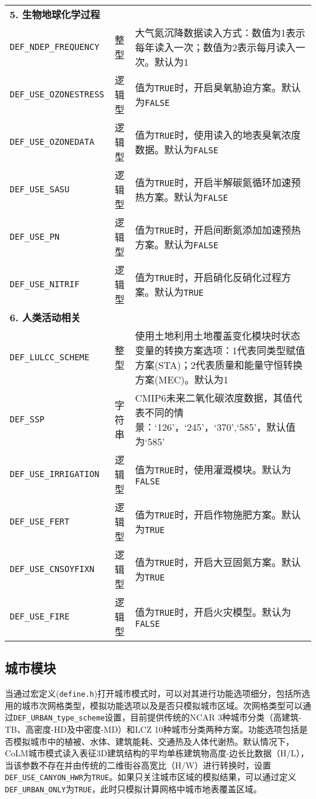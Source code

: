 {\begin{longtable}[!htbp]{lcp{}}
\textbf{5. 生物地球化学过程} && \\
\texttt{DEF\_NDEP\_FREQUENCY} & 整型 & 大气氮沉降数据读入方式：数值为1表示每年读入一次；数值为2表示每月读入一次。默认为1 \\
\texttt{DEF\_USE\_OZONESTRESS} & 逻辑型 & 值为\texttt{TRUE}时，开启臭氧胁迫方案。默认为\texttt{FALSE} \\
\texttt{DEF\_USE\_OZONEDATA} & 逻辑型 & 值为\texttt{TRUE}时，使用读入的地表臭氧浓度数据。默认为\texttt{FALSE} \\
\texttt{DEF\_USE\_SASU} & 逻辑型 & 值为\texttt{TRUE}时，开启半解碳氮循环加速预热方案。默认为\texttt{FALSE}\\
\texttt{DEF\_USE\_PN} & 逻辑型 & 值为\texttt{TRUE}时，开启间断氮添加加速预热方案。默认为\texttt{FALSE}\\
\texttt{DEF\_USE\_NITRIF} & 逻辑型 & 值为\texttt{TRUE}时，开启硝化反硝化过程方案。默认为\texttt{TRUE} \\
\midrule

\textbf{6. 人类活动相关} && \\

\texttt{DEF\_LULCC\_SCHEME} & 整型 & 使用土地利用土地覆盖变化模块时状态变量的转换方案选项：1代表同类型赋值方案(STA)；2代表质量和能量守恒转换方案(MEC)。默认为1 \\
\texttt{DEF\_SSP} & 字符串 &  CMIP6未来二氧化碳浓度数据，其值代表不同的情景：`126'，`245'，`370',`585'，默认值为`585' \\
\texttt{DEF\_USE\_IRRIGATION} & 逻辑型 & 值为\texttt{TRUE}时，使用灌溉模块。默认为\texttt{FALSE} \\
\texttt{DEF\_USE\_FERT} & 逻辑型 & 值为\texttt{TRUE}时，开启作物施肥方案。默认为\texttt{TRUE}\\
\texttt{DEF\_USE\_CNSOYFIXN} & 逻辑型 & 值为\texttt{TRUE}时，开启大豆固氮方案。默认为\texttt{TRUE} \\
\texttt{DEF\_USE\_FIRE} & 逻辑型 & 值为\texttt{TRUE}时，开启火灾模型。默认为\texttt{FALSE} \\

\end{longtable}}

\subsection{城市模块}

当通过宏定义(\texttt {define.h})打开城市模式时，可以对其进行功能选项细分，包括所选用的城市次网格类型，模拟功能选项以及是否只模拟城市区域。次网格类型可以通过\texttt{DEF\_URBAN\_type\_scheme}设置，目前提供传统的NCAR 3种城市分类（高建筑-TB、高密度-HD及中密度-MD）和LCZ 10种城市分类两种方案。功能选项包括是否模拟城市中的植被、水体、建筑能耗、交通热及人体代谢热。默认情况下，CoLM城市模式读入表征3D建筑结构的平均单栋建筑物高度-边长比数据（H/L），当该参数不存在并由传统的二维街谷高宽比（H/W）进行转换时，设置\texttt{DEF\_USE\_CANYON\_HWR}为\texttt{TRUE}。如果只关注城市区域的模拟结果，可以通过定义\texttt{DEF\_URBAN\_ONLY}为\texttt{TRUE}，此时只模拟计算网格中城市地表覆盖区域。

